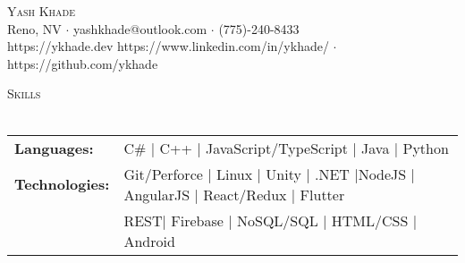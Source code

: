 \documentclass[a4paper]{article}
\newcommand{\lineunder} {
    \vspace*{-8pt} \\
    \hspace*{-18pt} \hrulefill \\
}
\newcommand{\header} [1] {
    {\hspace*{-18pt}\vspace*{6pt} \textsc{#1}}
    \vspace*{-6pt} \lineunder
}
\newcommand{\lineunder} {
    \vspace*{-8pt} \\
    \hspace*{-18pt} \hrulefill \\
}
\newcommand{\header} [1] {
    {\hspace*{-18pt}\vspace*{6pt} \textsc{#1}}
    \vspace*{-6pt} \lineunder
}
\begin{document}
\vspace*{-40pt}

    

\vspace*{-10pt}
\begin{center}
	{\Huge \scshape {Yash Khade}}\\
	Reno, NV $\cdot$ yashkhade@outlook.com $\cdot$ (775)-240-8433 \\ https://ykhade.dev https://www.linkedin.com/in/ykhade/ $\cdot$ https://github.com/ykhade
\end{center}

\header{Skills}
\begin{tabular}{ l l }
	\textbf{Languages:}    & C\#  | C++ | JavaScript/TypeScript | Java | Python   \\
	
	\textbf{Technologies:} & Git/Perforce | Linux | Unity | .NET |NodeJS | AngularJS | React/Redux | Flutter \\& REST| Firebase | NoSQL/SQL | HTML/CSS | Android \\
\end{tabular}
\vspace{2mm}
\end{document}
